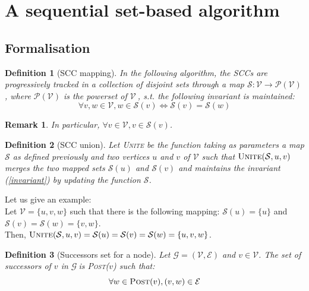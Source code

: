 \documentclass[a4 paper, 12pt]{article}
\def\GG{$\mathcal{G}~$}
\def\VV{$\mathcal{V}~$}
\newtheorem{definition}{Definition}
\newtheorem{remark}{Remark}
\begin{document}
\section{A sequential set-based algorithm}
\subsection{Formalisation}
\begin{definition}[SCC mapping]
    In the following algorithm, the SCCs are progressively tracked in a collection of disjoint sets through a map $\mathcal{S} : \mathcal{V} \longrightarrow \mathcal{P}(\mathcal{V})$, where $\mathcal{P}(\mathcal{V})$ is the powerset of \VV, s.t. the following invariant is maintained:
    \begin{equation}\label{invariant}
        \forall v, w \in \mathcal{V}, w\in \mathcal{S}(v) \Longleftrightarrow \mathcal{S}(v) = \mathcal{S}(w)
    \end{equation}
\end{definition}

\begin{remark}
    In particular, $\forall v \in \mathcal{V}, v \in \mathcal{S}(v)$.
\end{remark}

\begin{definition}[SCC union]
    Let \textsc{Unite} be the function taking as parameters a map $\mathcal{S}$ as defined previously and two vertices $u$ and $v$ of $\mathcal{V}$ such that $\textsc{Unite}(\mathcal{S}, u, v)$ merges the two mapped sets $\mathcal{S}(u)$ and $\mathcal{S}(v)$ and maintains the invariant (\ref{invariant}) by updating the function $\mathcal{S}$.
\end{definition}
Let us give an example:\\
Let $\mathcal{V} = \{u,v,w\}$ such that there is the following mapping: $\mathcal{S}(u) = \{u\}$ and $\mathcal{S}(v) = \mathcal{S}(w) = \{v,w\}$.\\
Then, $\textsc{Unite}(\mathcal{S}, u, v) = \mathcal{S}(u) = \mathcal{S}(v) = \mathcal{S}(w) = \{u,v,w\}$.

\begin{definition}[Successors set for a node]
    Let $\mathcal{G} = (\mathcal{V}, \mathcal{E})$ and $v \in \mathcal{V}$. The set of successors of $v$ in \GG is \textsc{Post}($v$) such that:
    \begin{equation*}
        \forall w\in \textsc{Post}(v), (v,w)\in \mathcal{E}
    \end{equation*}
\end{definition}
\end{document}
